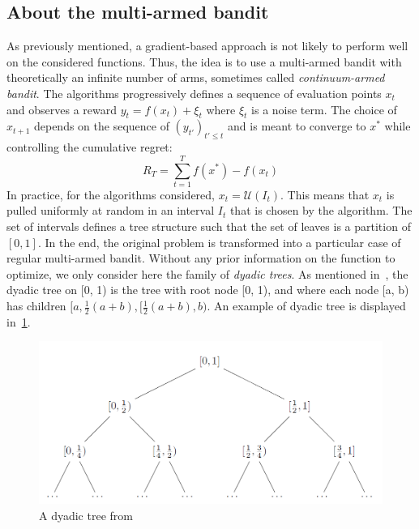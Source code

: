 \documentclass[a4paper,10pt]{article}
\begin{document}
\subsection{About the multi-armed bandit}
As previously mentioned, a gradient-based approach is not likely to perform well on the considered functions. Thus, the idea is to use a multi-armed bandit with theoretically an infinite number of arms, sometimes called \textit{continuum-armed bandit}. The algorithms progressively defines a sequence of evaluation points $x_t$ and observes a reward $y_t=f(x_t)+\xi_t$ where $\xi_t$ is a noise term. The choice of $x_{t+1}$ depends on the sequence of $(y_{t'})_{t'\le t}$ and is meant to converge to $x^*$ while controlling the cumulative regret:
\begin{equation}
\label{regret}
R_T = \underset{t=1}{\overset{T}{\sum}}f(x^*)-f(x_t)
\end{equation}
In practice, for the algorithms considered, $x_t = \mathcal{U}(I_t)$. This means that $x_t$ is pulled uniformly at random in an interval $I_t$ that is chosen by the algorithm. The set of intervals defines a tree structure such that the set of leaves is a partition of $[0,1]$. In the end, the original problem is transformed into a particular case of regular multi-armed bandit. Without any prior information on the function to optimize, we only consider here the family of \textit{dyadic trees}. As mentioned in~\cite{bull2013adaptive}, the dyadic tree on [0, 1) is the tree with root node [0, 1), and where each node [a, b) has children $[a, \frac{1}{2}(a+b), [ \frac{1}{2}(a+b), b)$. An example of dyadic tree is displayed in~\ref{dydtree}. 

\begin{figure}
\label{dydtree}
\centering
\includegraphics[scale=0.3]{dyadic}
\caption{A dyadic tree from~\cite{bull2013adaptive}}
\end{figure}
\end{document}
